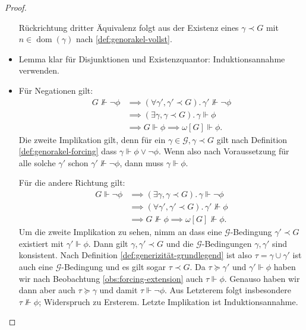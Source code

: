 \documentclass[nofonts]{uebung}
\theoremstyle{definition}
\DeclareMathOperator{\dom}{dom}
\begin{document}
\begin{proof}
\begin{itemize}
            Rückrichtung dritter Äquivalenz folgt aus der Existenz eines $\gamma\prec G$ mit $n\in\dom(\gamma)$ nach \ref{def:genorakel-vollst}.
        \item Lemma klar für Disjunktionen und Existenzquantor: Induktionsannahme verwenden.
        \item Für Negationen gilt: 
            \begin{align*}
                G\not\Vdash \neg\phi &\implies (\forall \gamma', \gamma'\prec G).\,\gamma'\not\Vdash \neg\phi\\
                                     &\implies (\exists \gamma, \gamma\prec G).\,\gamma\Vdash \phi\\
                                     &\implies G\Vdash\phi \implies \omega[G]\Vdash \phi.
            \end{align*}
            Die zweite Implikation gilt, denn für ein $\gamma\in \mathcal G, \gamma\prec G$ gilt nach Definition \ref{def:genorakel-forcing} dass $\gamma\Vdash \phi\lor \neg \phi$.
            Wenn also nach Voraussetzung für alle solche $\gamma'$ schon $\gamma'\not\Vdash \neg\phi$, dann muss $\gamma\Vdash \phi$.

            Für die andere Richtung gilt:
            \begin{align*}
                G\Vdash \neg\phi &\implies (\exists \gamma, \gamma\prec G).\,\gamma\Vdash \neg\phi\\
                                     &\implies (\forall \gamma', \gamma'\prec G).\,\gamma'\not\Vdash \phi\\
                                     &\implies G\not\Vdash\phi \implies \omega[G]\not\Vdash \phi.
            \end{align*}
            Um die zweite Implikation zu sehen, nimm an dass eine $\mathcal G$-Bedingung $\gamma'\prec G$ existiert mit $\gamma'\Vdash\phi$.
            Dann gilt $\gamma, \gamma'\prec G$ und die $\mathcal G$-Bedingungen $\gamma, \gamma'$ sind konsistent.
            Nach Definition \ref{def:generizität-grundlegend} ist also $\tau=\gamma\cup \gamma'$ ist auch eine $\mathcal G$-Bedingung und es gilt sogar $\tau\prec G$.
            Da $\tau\succeq\gamma'$ und $\gamma'\Vdash\phi$ haben wir nach Beobachtung \ref{obs:forcing-extension} auch $\tau\Vdash\phi$.
            Genauso haben wir dann aber auch $\tau\succeq\gamma$ und damit $\tau\Vdash \neg\phi$. Aus Letzterem folgt insbesondere $\tau\not\Vdash\phi$; Widerspruch zu Ersterem. Letzte Implikation ist Induktionsannahme. \qedhere
    \end{itemize}
\end{proof}
\end{document}
